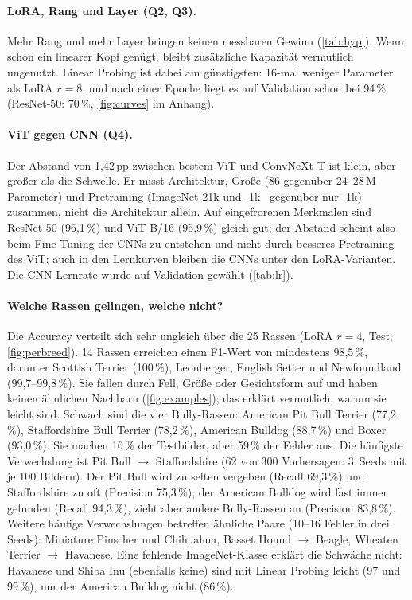 \paragraph{LoRA, Rang und Layer (Q2, Q3).}
Mehr Rang und mehr Layer bringen keinen messbaren Gewinn (\cref{tab:hyp}). Wenn schon ein linearer Kopf
genügt, bleibt zusätzliche Kapazität vermutlich ungenutzt. Linear Probing ist dabei am günstigsten: 16-mal
weniger Parameter als LoRA $r=8$, und nach einer Epoche liegt es auf Validation schon bei 94\,\%
(ResNet-50: 70\,\%, \cref{fig:curves} im Anhang).

\paragraph{ViT gegen CNN (Q4).}
Der Abstand von 1,42\,pp zwischen bestem ViT und ConvNeXt-T ist klein, aber größer als die Schwelle. Er
misst Architektur, Größe (86 gegenüber 24--28\,M Parameter) und Pretraining (ImageNet-21k und
-1k~\cite{deng2009imagenet} gegenüber nur -1k) zusammen, nicht die Architektur allein. Auf
eingefrorenen Merkmalen sind ResNet-50 (96,1\,\%) und ViT-B/16 (95,9\,\%) gleich gut; der Abstand
scheint also beim Fine-Tuning der CNNs zu entstehen und nicht durch besseres Pretraining des ViT; auch in den
Lernkurven bleiben die CNNs unter den LoRA-Varianten. Die CNN-Lernrate wurde auf Validation gewählt (\cref{tab:lr}).

\paragraph{Welche Rassen gelingen, welche nicht?}
Die Accuracy verteilt sich sehr ungleich über die 25 Rassen (LoRA $r=4$, Test; \cref{fig:perbreed}).
14 Rassen erreichen einen F1-Wert von mindestens 98,5\,\%, darunter Scottish Terrier (100\,\%), Leonberger,
English Setter und Newfoundland (99,7--99,8\,\%). Sie fallen durch Fell, Größe oder Gesichtsform auf und haben
keinen ähnlichen Nachbarn (\cref{fig:examples}); das erklärt vermutlich, warum sie leicht sind.
Schwach sind die vier Bully-Rassen: American Pit Bull Terrier (77,2\,\%), Staffordshire Bull Terrier (78,2\,\%),
American Bulldog (88,7\,\%) und Boxer (93,0\,\%). Sie machen 16\,\% der Testbilder, aber 59\,\% der Fehler aus. Die häufigste Verwechslung
ist Pit Bull $\rightarrow$ Staffordshire (62 von 300 Vorhersagen: 3~Seeds mit je 100 Bildern). Der Pit Bull wird zu selten
vergeben (Recall 69,3\,\%) und Staffordshire zu oft (Precision 75,3\,\%); der American Bulldog wird fast immer gefunden (Recall 94,3\,\%),
zieht aber andere Bully-Rassen an (Precision 83,8\,\%). Weitere häufige Verwechslungen betreffen ähnliche Paare (10--16 Fehler
in drei Seeds): Miniature Pinscher und Chihuahua, Basset Hound $\rightarrow$ Beagle, Wheaten Terrier $\rightarrow$ Havanese. Eine fehlende ImageNet-Klasse erklärt die Schwäche nicht: Havanese und Shiba Inu (ebenfalls keine) sind mit Linear Probing leicht (97 und 99\,\%), nur der American Bulldog nicht (86\,\%).

